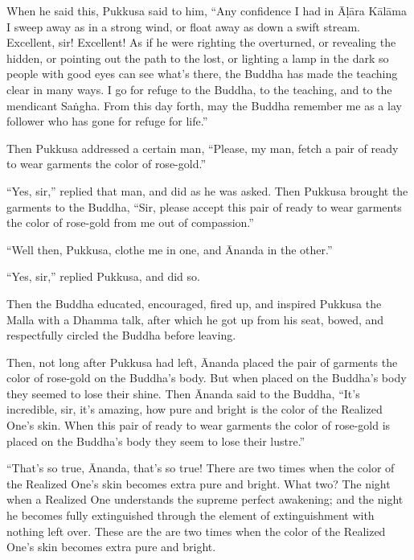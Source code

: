\documentclass[12pt,openany]{book}%
\begin{document}
When he said this, Pukkusa said to him, “Any confidence I had in \textsanskrit{Āḷāra} \textsanskrit{Kālāma} I sweep away as in a strong wind, or float away as down a swift stream. Excellent, sir! Excellent! As if he were righting the overturned, or revealing the hidden, or pointing out the path to the lost, or lighting a lamp in the dark so people with good eyes can see what’s there, the Buddha has made the teaching clear in many ways. I go for refuge to the Buddha, to the teaching, and to the mendicant \textsanskrit{Saṅgha}. From this day forth, may the Buddha remember me as a lay follower who has gone for refuge for life.” 

Then Pukkusa addressed a certain man, “Please, my man, fetch a pair of ready to wear garments the color of rose-gold.” 

“Yes, sir,” replied that man, and did as he was asked. Then Pukkusa brought the garments to the Buddha, “Sir, please accept this pair of ready to wear garments the color of rose-gold from me out of compassion.” 

“Well then, Pukkusa, clothe me in one, and Ānanda in the other.” 

“Yes, sir,” replied Pukkusa, and did so. 

Then the Buddha educated, encouraged, fired up, and inspired Pukkusa the Malla with a Dhamma talk, after which he got up from his seat, bowed, and respectfully circled the Buddha before leaving. 

Then, not long after Pukkusa had left, Ānanda placed the pair of garments the color of rose-gold on the Buddha’s body. But when placed on the Buddha’s body they seemed to lose their shine. Then Ānanda said to the Buddha, “It’s incredible, sir, it’s amazing, how pure and bright is the color of the Realized One’s skin. When this pair of ready to wear garments  the color of rose-gold is placed on the Buddha’s body they seem to lose their lustre.” 

“That’s so true, Ānanda, that’s so true! There are two times when the color of the Realized One’s skin becomes extra pure and bright. What two? The night when a Realized One understands the supreme perfect awakening; and the night he becomes fully extinguished through the element of extinguishment with nothing left over. These are the are two times when the color of the Realized One’s skin becomes extra pure and bright. 
\end{document}
